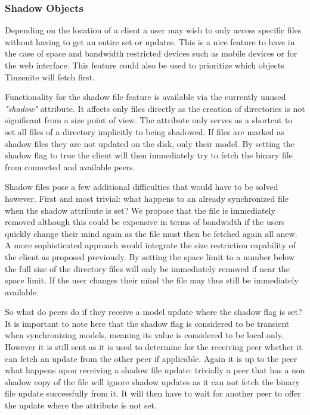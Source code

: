 \subsubsection{Shadow Objects}
\label{subs:Shadow Objects}

Depending on the location of a client a user may wish to only access specific files without having to get an entire set or updates.
This is a nice feature to have in the case of space and bandwidth restricted devices such as mobile devices or for the web interface.
This feature could also be used to prioritize which objects Tinzenite will fetch first.

Functionality for the shadow file feature is available via the currently unused \textit{"shadow"} attribute.
It affects only files directly as the creation of directories is not significant from a size point of view.
The attribute only serves as a shortcut to set all files of a directory implicitly to being shadowed.
If files are marked as shadow files they are not updated on the disk, only their model.
By setting the shadow flag to true the client will then immediately try to fetch the binary file from connected and available peers.

Shadow files pose a few additional difficulties that would have to be solved however.
First and most trivial: what happens to an already synchronized file when the shadow attribute is set?
We propose that the file is immediately removed although this could be expensive in terms of bandwidth if the users quickly change their mind again as the file must then be fetched again all anew.
A more sophisticated approach would integrate the size restriction capability of the client as proposed previously.
By setting the space limit to a number below the full size of the directory files will only be immediately removed if near the space limit.
If the user changes their mind the file may thus still be immediately available.

So what do peers do if they receive a model update where the shadow flag is set?
It is important to note here that the shadow flag is considered to be transient when synchronizing models, meaning its value is considered to be local only.
However it is still sent as it is used to determine for the receiving peer whether it can fetch an update from the other peer if applicable.
Again it is up to the peer what happens upon receiving a shadow file update: trivially a peer that has a non shadow copy of the file will ignore shadow updates as it can not fetch the binary file update successfully from it.
It will then have to wait for another peer to offer the update where the attribute is not set.

